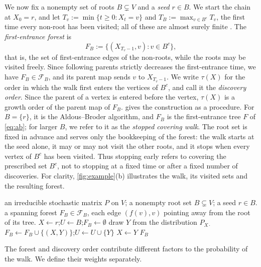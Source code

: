 \documentclass[onefignum,onetabnum,nohypdvips]{siamart250211}
\numberwithin{theorem}{section}
\numberwithin{equation}{section}
\newcommand{\Fset}{\mathcal{F}}
\begin{document}
We now fix a nonempty set of roots $B\subsetneq V$ and
a \emph{seed} $r\in B$. We start the chain at $X_0=r$, and let
$T_v:=\min\{t\ge0:X_t=v\}$ and $T_B:=\max_{v\in B^c}T_v$, the first
time every non-root has been visited; all of these are almost surely
finite \cite[Lem.~1.13]{LevinPeres2017}. The \emph{first-entrance
forest} is
\[
F_B:=\{(X_{T_v-1},v):v\in B^c\},
\]
that is, the set of first-entrance edges of the non-roots, while the
roots may be visited freely. Since following parents strictly decreases
the first-entrance time, we have $F_B\in\Fset_B$, and its parent map
sends $v$ to $X_{T_v-1}$. We write $\tau(X)$ for the order in which the
walk first enters the vertices of $B^c$, and call it the \emph{discovery
order}. Since the parent of a vertex is entered before the vertex,
$\tau(X)$ is a growth order of the parent map of $F_B$.  gives the
construction as a procedure. For $B=\{r\}$, it is the Aldous--Broder
algorithm, and $F_B$ is the first-entrance tree $F$ of \eqref{eq:ab};
for larger $B$, we refer to it as the \emph{stopped covering walk}.
The root set is fixed in advance and serves only the bookkeeping of the
forest: the walk starts at the seed alone, it may or may not visit the
other roots, and it stops when every vertex of $B^c$ has been visited.
Thus stopping early refers to covering the prescribed set $B^c$, not to
stopping at a fixed time or after a fixed number of discoveries.
For clarity, \cref{fig:example}(b) illustrates the walk, its visited
sets and the resulting forest.
\begin{algorithm}[H]
\caption{Stopped covering walk and its first-entrance forest.}\label{alg:stopped}
\begin{algorithmic}[1]
\Require an irreducible stochastic matrix $P$ on $V$; a nonempty
root set $B\subsetneq V$; a seed $r\in B$.
\Ensure a spanning forest $F_B\in\Fset_B$, each edge $(f(v),v)$
pointing away from the root of its tree.
\State $X\gets r$;\quad $U\gets B$;\quad $F_B\gets\emptyset$
  \State draw $Y$ from the distribution $P_{X\cdot}$
    \State $F_B\gets F_B\cup\{(X,Y)\}$;\quad $U\gets U\cup\{Y\}$
  \EndIf
  \State $X\gets Y$
\EndWhile
\State \Return $F_B$
\end{algorithmic}
\end{algorithm}

The forest and discovery order contribute different factors to the
probability of the walk. We define their weights separately.
\end{document}
